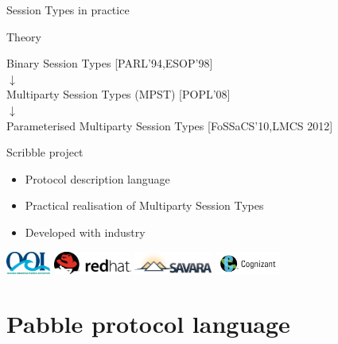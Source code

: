 \documentclass[xcolor={dvipsnames}]{beamer}
\newcommand{\bib}[1]{\textcolor{black!60}{\footnotesize [#1]}}
\begin{document}
\begin{frame}{Session Types in practice}
  \begin{block}{Theory}
  \begin{center}
    Binary Session Types \bib{PARL'94,ESOP'98}\\
    $\downarrow$\\
    Multiparty Session Types (MPST) \bib{POPL'08}\\
    $\downarrow$\\
    Parameterised Multiparty Session Types \bib{FoSSaCS'10,LMCS 2012}
  \end{center}
\end{block}
Scribble project
  \begin{itemize}
    \item Protocol description language
    \item Practical realisation of Multiparty Session Types
    \item Developed with industry
  \end{itemize}

  \includegraphics[height=2em]{ooi-logo}
  \hfill
  \includegraphics[height=2em]{redhat-logo}
  \hfill
  \includegraphics[height=2em]{savara-logo}
  \hfill
  \includegraphics[height=2em]{cognizant-logo}
\end{frame}

\section{Pabble protocol language}
\end{document}
